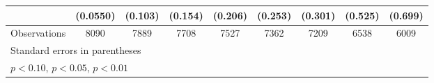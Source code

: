 \begin{table}[htbp]
\begin{tabular}{l*{8}{c}}
                    &    (0.0550)         &     (0.103)         &     (0.154)         &     (0.206)         &     (0.253)         &     (0.301)         &     (0.525)         &     (0.699)         \\
\hline
Observations        &        8090         &        7889         &        7708         &        7527         &        7362         &        7209         &        6538         &        6009         \\
\hline\hline
\multicolumn{9}{l}{\footnotesize Standard errors in parentheses}\\
\multicolumn{9}{l}{\footnotesize \sym{*} \(p<0.10\), \sym{**} \(p<0.05\), \sym{***} \(p<0.01\)}\\
\end{tabular}
\end{table}
